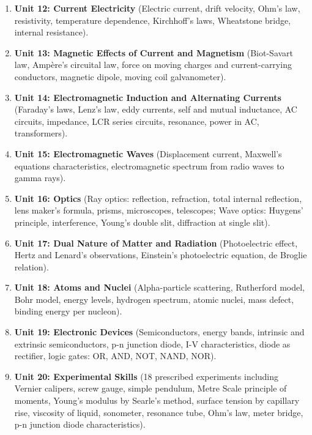 \documentclass[10pt,twoside,openright]{book}
\begin{document}
\begin{enumerate}[leftmargin=*]
  \item \textbf{Unit 12: Current Electricity} (Electric current, drift velocity, Ohm's law, resistivity, temperature dependence, Kirchhoff's laws, Wheatstone bridge, internal resistance).
  \item \textbf{Unit 13: Magnetic Effects of Current and Magnetism} (Biot-Savart law, Ampère's circuital law, force on moving charges and current-carrying conductors, magnetic dipole, moving coil galvanometer).
  \item \textbf{Unit 14: Electromagnetic Induction and Alternating Currents} (Faraday's laws, Lenz's law, eddy currents, self and mutual inductance, AC circuits, impedance, LCR series circuits, resonance, power in AC, transformers).
  \item \textbf{Unit 15: Electromagnetic Waves} (Displacement current, Maxwell's equations characteristics, electromagnetic spectrum from radio waves to gamma rays).
  \item \textbf{Unit 16: Optics} (Ray optics: reflection, refraction, total internal reflection, lens maker's formula, prisms, microscopes, telescopes; Wave optics: Huygens' principle, interference, Young's double slit, diffraction at single slit).
  \item \textbf{Unit 17: Dual Nature of Matter and Radiation} (Photoelectric effect, Hertz and Lenard's observations, Einstein's photoelectric equation, de Broglie relation).
  \item \textbf{Unit 18: Atoms and Nuclei} (Alpha-particle scattering, Rutherford model, Bohr model, energy levels, hydrogen spectrum, atomic nuclei, mass defect, binding energy per nucleon).
  \item \textbf{Unit 19: Electronic Devices} (Semiconductors, energy bands, intrinsic and extrinsic semiconductors, p-n junction diode, I-V characteristics, diode as rectifier, logic gates: OR, AND, NOT, NAND, NOR).
  \item \textbf{Unit 20: Experimental Skills} (18 prescribed experiments including Vernier calipers, screw gauge, simple pendulum, Metre Scale principle of moments, Young's modulus by Searle's method, surface tension by capillary rise, viscosity of liquid, sonometer, resonance tube, Ohm's law, meter bridge, p-n junction diode characteristics).
\end{enumerate}
\end{document}
